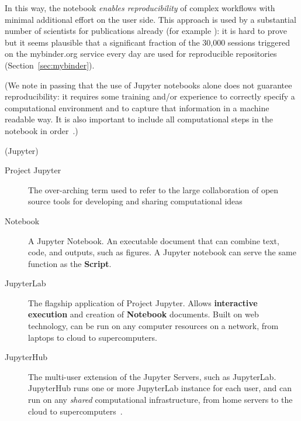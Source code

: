 In this way, the notebook \emph{enables reproducibility} of complex workflows
with minimal additional effort on the user side. This approach is used by a
substantial number of scientists for publications already (for example
\cite{GitHubRepoExampleAlbert2016,GitHubRepoExampleCortes2018,Beg2019-blochpoint-data-repository, }
): it is hard to prove
but it seems plausible that a significant fraction of the 30,000 sessions
triggered on the mybinder.org service every day are used for reproducible repositories
(Section~\ref{sec:mybinder}).

(We note in passing that the use of Jupyter notebooks alone does not guarantee
reproducibility: it requires some training and/or experience to correctly specify a
computational environment and to capture that information in a machine readable
way. It is also important to include all computational steps in the notebook in
order~\cite{Beg2021}.)

\begin{terminology}{(Jupyter)}
\begin{description}
\item[Project Jupyter] The over-arching term used to refer to the large collaboration of open source
  tools for developing and sharing computational ideas

\item[Notebook] A Jupyter Notebook. An executable document that can
  combine text, code, and outputs, such as figures.
  A Jupyter notebook can serve the same function as the \textbf{Script}.

\item[JupyterLab] The flagship application of Project Jupyter.
  Allows \textbf{interactive execution} and creation of
  \textbf{Notebook} documents.
  Built on web technology,
  can be run on any computer resources on a network,
  from laptops to cloud to supercomputers.

\item[JupyterHub] The multi-user extension of the Jupyter Servers, such as JupyterLab.
  JupyterHub runs one or more JupyterLab instance for each user,
  and can run on any \emph{shared} computational infrastructure,
  from home servers to the cloud to supercomputers~\cite{Fangohr2020}.

\end{description}
\end{terminology}
